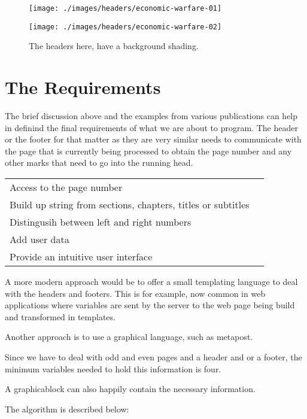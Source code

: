 \begin{figure}[htp]
\texttt{[image: ./images/headers/economic-warfare-01]}

\vspace*{1cm}
\texttt{[image: ./images/headers/economic-warfare-02]}

\caption{The headers here, have a background shading.}
\end{figure}


\section{The Requirements}

The brief discussion above and the examples from various publications can help in definind the final requirements of what we are about to program. The header or the footer for that matter as they are very similar needs to communicate with the page that is currently being processed to obtain the page number and any other marks that need to go into the running head.

\begin{tabular}{>{\raggedright}p{5cm}l}
Access to the page number & \\
Build up string from sections, chapters, titles or subtitles &\\
Distingusih between left and right numbers &\\
Add user data  &\\
Provide an intuitive user interface&\\
\end{tabular}

A more modern approach would be to offer a small templating language to deal with the headers and footers. This is for example, now common in web applications where variables are sent by the server to the web page being build and transformed in templates.

Another approach is to use a graphical language, such as metapost.

Since we have to deal with odd and even pages and a header and or a footer, the minimum variables needed to hold this information is four. 

A graphicablock can also happily contain the necessary information.

The algorithm is described below:

